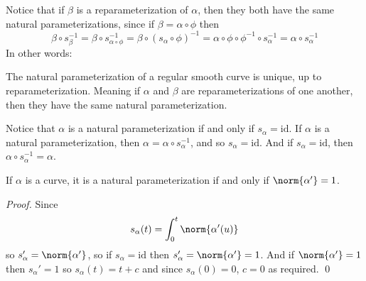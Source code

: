 Notice that if $\beta$ is a reparameterization of $\alpha$, then they both have the same natural parameterizations, since if $\beta=\alpha\circ\phi$ then
\[ \beta\circ s_\beta^{-1} = \beta\circ s_{\alpha\circ\phi}^{-1} = \beta\circ(s_\alpha\circ\phi)^{-1} = \alpha\circ\phi\circ\phi^{-1}\circ s_\alpha^{-1} = \alpha\circ s_\alpha^{-1} \]
In other words:

\begin{prop*}

    The natural parameterization of a regular smooth curve is unique, up to reparameterization.
    Meaning if $\alpha$ and $\beta$ are reparameterizations of one another, then they have the same natural parameterization.

\end{prop*}

Notice that $\alpha$ is a natural parameterization if and only if $s_\alpha=\mathrm{id}$.
If $\alpha$ is a natural parameterization, then $\alpha=\alpha\circ s_\alpha^{-1}$, and so $s_\alpha=\mathrm{id}$.
And if $s_\alpha=\mathrm{id}$, then $\alpha\circ s_\alpha^{-1}=\alpha$.

\begin{prop*}

    If $\alpha$ is a curve, it is a natural parameterization if and only if $\norm{\alpha'}=1$.

\end{prop*}

\begin{proof}

    Since
    \[ s_\alpha(t) = \int_0^t \norm{\alpha'(u)} \]
    so $s_\alpha'=\norm{\alpha'}$, so if $s_\alpha=\mathrm{id}$ then $s_\alpha'=\norm{\alpha'}=1$.
    And if $\norm{\alpha'}=1$ then $s_\alpha'=1$ so $s_\alpha(t)=t+c$ and since $s_\alpha(0)=0$, $c=0$ as required.
    \qed

\end{proof}


